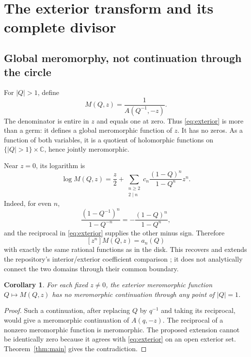 \documentclass[11pt,a4paper]{article}
\numberwithin{equation}{section}
\newtheorem{corollary}[theorem]{Corollary}
\theoremstyle{definition}
\theoremstyle{remark}
\newcommand{\C}{\mathbb C}
\begin{document}
\section{The exterior transform and its complete divisor}
\subsection{Global meromorphy, not continuation through the circle}
For \(|Q|>1\), define
\begin{equation}\label{eq:exterior}
 M(Q,z)=\frac1{A(Q^{-1},-z)}.
\end{equation}
The denominator is entire in \(z\) and equals one at zero. Thus \eqref{eq:exterior} is more than a germ: it defines a global meromorphic function of \(z\). It has no zeros. As a function of both variables, it is a quotient of holomorphic functions on \(\{|Q|>1\}\times\C\), hence jointly meromorphic.

Near \(z=0\), its logarithm is
\begin{equation}\label{eq:exterior-log}
 \log M(Q,z)=\frac z2+
 \sum_{\substack{n\ge2\\2\mid n}}c_n
        \frac{(1-Q)^n}{1-Q^n}z^n.
\end{equation}
Indeed, for even \(n\),
\[
 \frac{(1-Q^{-1})^n}{1-Q^{-n}}
 =-\frac{(1-Q)^n}{1-Q^n},
\]
and the reciprocal in \eqref{eq:exterior} supplies the other minus sign. Therefore
\begin{equation}\label{eq:exterior-coeff}
 [z^n]M(Q,z)=a_n(Q)
\end{equation}
with exactly the same rational functions as in the disk. This recovers and extends the repository's interior/exterior coefficient comparison \cite{repo}; it does not analytically connect the two domains through their common boundary.

\begin{corollary}\label{cor:outer-nb}
For each fixed \(z\ne0\), the exterior meromorphic function \(Q\mapsto M(Q,z)\) has no meromorphic continuation through any point of \(|Q|=1\).
\end{corollary}
\begin{proof}
Such a continuation, after replacing \(Q\) by \(q^{-1}\) and taking its reciprocal, would give a meromorphic continuation of \(A(q,-z)\). The reciprocal of a nonzero meromorphic function is meromorphic. The proposed extension cannot be identically zero because it agrees with \eqref{eq:exterior} on an open exterior set. Theorem~\ref{thm:main} gives the contradiction.
\end{proof}
\end{document}
